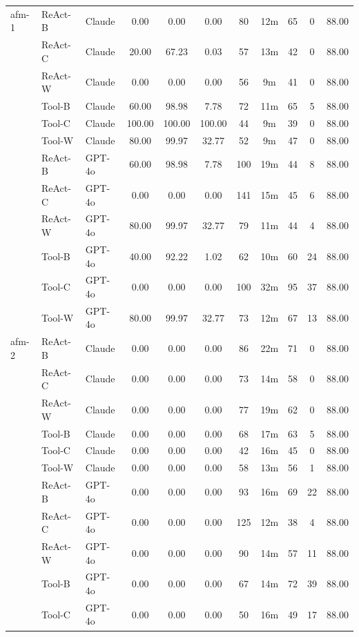 \begin{longtable}{lllcccccccc}
afm-1 & ReAct-B & Claude & 0.00 & 0.00 & 0.00 & 80 & 12m & 65 & 0 & 88.00 \\
 & ReAct-C & Claude & 20.00 & 67.23 & 0.03 & 57 & 13m & 42 & 0 & 88.00 \\
 & ReAct-W & Claude & 0.00 & 0.00 & 0.00 & 56 & 9m & 41 & 0 & 88.00 \\
 & Tool-B & Claude & 60.00 & 98.98 & 7.78 & 72 & 11m & 65 & 5 & 88.00 \\
 & Tool-C & Claude & 100.00 & 100.00 & 100.00 & 44 & 9m & 39 & 0 & 88.00 \\
 & Tool-W & Claude & 80.00 & 99.97 & 32.77 & 52 & 9m & 47 & 0 & 88.00 \\
 & ReAct-B & GPT-4o & 60.00 & 98.98 & 7.78 & 100 & 19m & 44 & 8 & 88.00 \\
 & ReAct-C & GPT-4o & 0.00 & 0.00 & 0.00 & 141 & 15m & 45 & 6 & 88.00 \\
 & ReAct-W & GPT-4o & 80.00 & 99.97 & 32.77 & 79 & 11m & 44 & 4 & 88.00 \\
 & Tool-B & GPT-4o & 40.00 & 92.22 & 1.02 & 62 & 10m & 60 & 24 & 88.00 \\
 & Tool-C & GPT-4o & 0.00 & 0.00 & 0.00 & 100 & 32m & 95 & 37 & 88.00 \\
 & Tool-W & GPT-4o & 80.00 & 99.97 & 32.77 & 73 & 12m & 67 & 13 & 88.00 \\
afm-2 & ReAct-B & Claude & 0.00 & 0.00 & 0.00 & 86 & 22m & 71 & 0 & 88.00 \\
 & ReAct-C & Claude & 0.00 & 0.00 & 0.00 & 73 & 14m & 58 & 0 & 88.00 \\
 & ReAct-W & Claude & 0.00 & 0.00 & 0.00 & 77 & 19m & 62 & 0 & 88.00 \\
 & Tool-B & Claude & 0.00 & 0.00 & 0.00 & 68 & 17m & 63 & 5 & 88.00 \\
 & Tool-C & Claude & 0.00 & 0.00 & 0.00 & 42 & 16m & 45 & 0 & 88.00 \\
 & Tool-W & Claude & 0.00 & 0.00 & 0.00 & 58 & 13m & 56 & 1 & 88.00 \\
 & ReAct-B & GPT-4o & 0.00 & 0.00 & 0.00 & 93 & 16m & 69 & 22 & 88.00 \\
 & ReAct-C & GPT-4o & 0.00 & 0.00 & 0.00 & 125 & 12m & 38 & 4 & 88.00 \\
 & ReAct-W & GPT-4o & 0.00 & 0.00 & 0.00 & 90 & 14m & 57 & 11 & 88.00 \\
 & Tool-B & GPT-4o & 0.00 & 0.00 & 0.00 & 67 & 14m & 72 & 39 & 88.00 \\
 & Tool-C & GPT-4o & 0.00 & 0.00 & 0.00 & 50 & 16m & 49 & 17 & 88.00 \\

\end{longtable}
